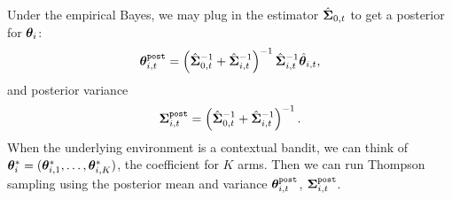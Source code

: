 \documentclass{article}
\newcommand{\sam}[1]{
  {\color{blue} [SAM: {#1}]}
 }
\def\post{{\texttt{post}}}
\begin{document}


Under the empirical Bayes, we may plug in the estimator $\hat {{\bm{\Sigma}}}_{0, t}$ to get a posterior for ${\bm{\theta}}_{i}$:
\[
    \vtheta_{i, t}^{\post} = \left(\hat \mSigma_{0, t}^{-1} + \hat \mSigma_{i, t}^{-1}\right)^{-1} \hat \mSigma_{i, t}^{-1} \hat \vtheta_{i, t},
\]
and posterior variance
\[
    \mSigma_{i, t}^{\post} = \left(\hat \mSigma_{0, t}^{-1} + \hat \mSigma_{i, t}^{-1}\right)^{-1}.
\]
When the underlying environment is a contextual bandit, we can think of ${\bm{\theta}}_i^* = ({\bm{\theta}}_{i, 1}^*, \dots, {\bm{\theta}}_{i, K}^*)$, the coefficient for $K$ arms. Then we can run Thompson sampling using the posterior mean and variance $\vtheta_{i, t}^{\post}$, $\mSigma_{i, t}^{\post}$.




\end{document}

